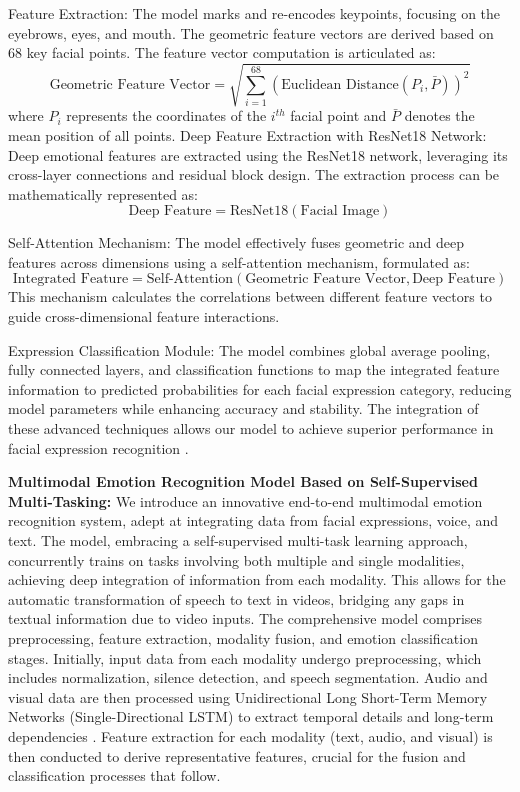 \documentclass[preprint,12pt]{elsarticle}
\begin{document}
Feature Extraction: The model marks and re-encodes keypoints, focusing on the eyebrows, eyes, and mouth. The geometric feature vectors are derived based on 68 key facial points. The feature vector computation is articulated as:
\begin{equation}
\text{Geometric Feature Vector} = \sqrt{\sum_{i=1}^{68} (\text{Euclidean Distance}(P_i, \bar{P}))^2}
\end{equation}
where \(P_i\) represents the coordinates of the \(i^{th}\) facial point and \(\bar{P}\) denotes the mean position of all points.
Deep Feature Extraction with ResNet18 Network: Deep emotional features are extracted using the ResNet18 network, leveraging its cross-layer connections and residual block design. The extraction process can be mathematically represented as:
\begin{equation}
\text{Deep Feature} = \text{ResNet18}(\text{Facial Image})
\end{equation}

Self-Attention Mechanism: The model effectively fuses geometric and deep features across dimensions using a self-attention mechanism, formulated as:
\begin{equation}
\text{Integrated Feature} = \text{Self-Attention}(\text{Geometric Feature Vector}, \text{Deep Feature})
\end{equation}
This mechanism calculates the correlations between different feature vectors to guide cross-dimensional feature interactions.

Expression Classification Module: The model combines global average pooling, fully connected layers, and classification functions to map the integrated feature information to predicted probabilities for each facial expression category, reducing model parameters while enhancing accuracy and stability. The integration of these advanced techniques allows our model to achieve superior performance in facial expression recognition \cite{ref40, ref41}.

\textbf{Multimodal Emotion Recognition Model Based on Self-Supervised Multi-Tasking:} We introduce an innovative end-to-end multimodal emotion recognition system, adept at integrating data from facial expressions, voice, and text. The model, embracing a self-supervised multi-task learning approach, concurrently trains on tasks involving both multiple and single modalities, achieving deep integration of information from each modality. This allows for the automatic transformation of speech to text in videos, bridging any gaps in textual information due to video inputs. The comprehensive model comprises preprocessing, feature extraction, modality fusion, and emotion classification stages. Initially, input data from each modality undergo preprocessing, which includes normalization, silence detection, and speech segmentation. Audio and visual data are then processed using Unidirectional Long Short-Term Memory Networks (Single-Directional LSTM) to extract temporal details and long-term dependencies \cite{ref42}. Feature extraction for each modality (text, audio, and visual) is then conducted to derive representative features, crucial for the fusion and classification processes that follow.
\end{document}

